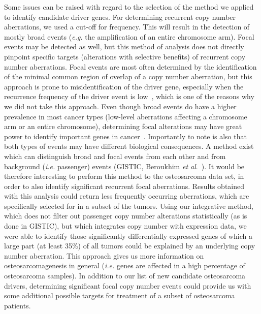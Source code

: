 Some issues can be raised with regard to the selection of the method we applied to identify candidate driver genes. For determining recurrent copy number aberrations, we used a cut-off for frequency. This will result in the detection of mostly broad events ({\it e.g.} the amplification of an entire chromosome arm). Focal events may be detected as well, but this method of analysis does not directly pinpoint specific targets (alterations with selective benefits) of recurrent copy number aberrations. Focal events are most often determined by the identification of the minimal common region of overlap of a copy number aberration, but this approach is prone to misidentification of the driver gene, especially when the recurrence frequency of the driver event is low~\cite{mermel2011gistic2}, which is one of the reasons why we did not take this approach. Even though broad events do have a higher prevalence in most cancer types (low\hyp{}level aberrations affecting a chromosome arm or an entire chromosome), determining focal alterations may have great power to identify important genes in cancer~\cite{beroukhim2010landscape}. Importantly to note is also that both types of events may have different biological consequences. A method exist which can distinguish broad and focal events from each other and from background ({\it i.e.} passenger) events (GISTIC, Beroukhim {\it et al}.~\cite{beroukhim2007assessing}). It would be therefore interesting to perform this method to the osteosarcoma data set, in order to also identify significant recurrent focal aberrations. Results obtained with this analysis could return less frequently occurring aberrations, which are specifically selected for in a subset of the tumors. Using our integrative method, which does not filter out passenger copy number alterations statistically (as is done in GISTIC), but which integrates copy number with expression data, we were able to identify those significantly differentially expressed genes of which a large part (at least 35\%) of all tumors could be explained by an underlying copy number aberration. This approach gives us more information on osteosarcomagenesis in general ({\it i.e.} genes are affected in a high percentage of osteosarcoma samples). In addition to our list of new candidate osteosarcoma drivers, determining significant focal copy number events could provide us with some additional possible targets for treatment of a subset of osteosarcoma patients.

